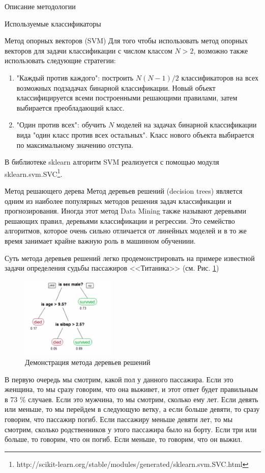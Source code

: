 \begin{section}{Описание методологии}
\begin{subsection}{Используемые классификаторы}
\begin{subsubsection}{Метод опорных векторов (SVM)}
Для того чтобы использовать метод опорных векторов для задачи классификации с числом классом $N > 2$, возможно также использовать следующие стратегии:
\begin{enumerate}
  \item "Каждый против каждого": построить $N(N-1)/2$ классификаторов на всех возможных подзадачах бинарной классификации. Новый объект классифицируется всеми построенными решающими правилами, затем выбирается преобладающий класс.
  \item "Один против всех": обучить $N$ моделей на задачах бинарной классификации вида "один класс против всех остальных". Класс нового объекта выбирается по максимальному значению отступа.
\end{enumerate}

В библиотеке sklearn алгоритм SVM реализуется с помощью модуля sklearn.svm.SVC\footnote{http://scikit-learn.org/stable/modules/generated/sklearn.svm.SVC.html}.
    \end{subsubsection}

    \begin{subsubsection}{Метод решающего дерева}
	\label{dt}
Метод деревьев решений (decision trees) является одним из наиболее популярных методов решения задач классификации и прогнозирования. Иногда этот метод Data Mining также называют деревьями решающих правил, деревьями классификации и регрессии. Это семейство алгоритмов, которое очень сильно отличается от линейных моделей и в то же время занимает крайне важную роль в машинном обучениии.

Суть метода деревьев решений легко продемонстрировать на примере известной задачи определения судьбы пассажиров <<Титаника>> (см. Рис. \ref{pic:dt1})

\begin{figure}[ht!]
\centering
\includegraphics[width=0.4\textwidth]{pics/dt1}
\caption{Демонстрация метода деревьев решений}
\label{pic:dt1}
\end{figure}

 В первую очередь мы смотрим, какой пол у данного пассажира. Если это женщина, то мы сразу говорим, что она выживет, и этот ответ будет правильным в 73 \% случаев. Если это мужчина, то мы смотрим, сколько ему лет. Если девять или меньше, то мы перейдем в следующую ветку, а если больше девяти, то сразу говорим, что пассажир погиб. Если пассажиру меньше девяти лет, то мы смотрим, сколько родственников у этого пассажира было на борту. Если три или больше, то говорим, что он погиб. Если меньше, то говорим, что он выжил.


\end{subsubsection}
\end{subsection}
\end{section}
